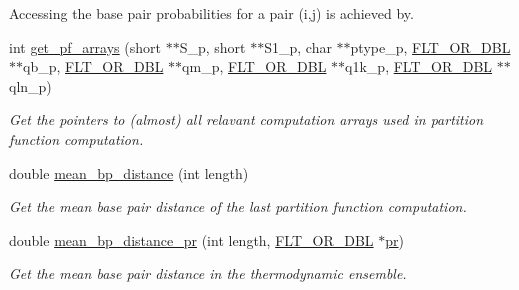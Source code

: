 \begin{DoxyCompactItemize}
\begin{DoxyCompactList}
Accessing the base pair probabilities for a pair (i,j) is achieved by. \end{DoxyCompactList}\item 
int \hyperlink{group__pf__fold_ga42faebdfce6f070c5f89adfc8427525c}{get\+\_\+pf\+\_\+arrays} (short $\ast$$\ast$S\+\_\+p, short $\ast$$\ast$S1\+\_\+p, char $\ast$$\ast$ptype\+\_\+p, \hyperlink{group__data__structures_ga31125aeace516926bf7f251f759b6126}{F\+L\+T\+\_\+\+O\+R\+\_\+\+D\+BL} $\ast$$\ast$qb\+\_\+p, \hyperlink{group__data__structures_ga31125aeace516926bf7f251f759b6126}{F\+L\+T\+\_\+\+O\+R\+\_\+\+D\+BL} $\ast$$\ast$qm\+\_\+p, \hyperlink{group__data__structures_ga31125aeace516926bf7f251f759b6126}{F\+L\+T\+\_\+\+O\+R\+\_\+\+D\+BL} $\ast$$\ast$q1k\+\_\+p, \hyperlink{group__data__structures_ga31125aeace516926bf7f251f759b6126}{F\+L\+T\+\_\+\+O\+R\+\_\+\+D\+BL} $\ast$$\ast$qln\+\_\+p)
\begin{DoxyCompactList}\small\item\em Get the pointers to (almost) all relavant computation arrays used in partition function computation. \end{DoxyCompactList}\item 
double \hyperlink{group__pf__fold_ga79cbc375af65f11609feb6b055269e7d}{mean\+\_\+bp\+\_\+distance} (int length)
\begin{DoxyCompactList}\small\item\em Get the mean base pair distance of the last partition function computation. \end{DoxyCompactList}\item 
double \hyperlink{group__pf__fold_gad5ba36cef8d01cf4244cc09b9bf1ce1d}{mean\+\_\+bp\+\_\+distance\+\_\+pr} (int length, \hyperlink{group__data__structures_ga31125aeace516926bf7f251f759b6126}{F\+L\+T\+\_\+\+O\+R\+\_\+\+D\+BL} $\ast$\hyperlink{fold__vars_8h_ac98ec419070aee6831b44e5c700f090f}{pr})
\begin{DoxyCompactList}\small\item\em Get the mean base pair distance in the thermodynamic ensemble. \end{DoxyCompactList}\end{DoxyCompactItemize}
